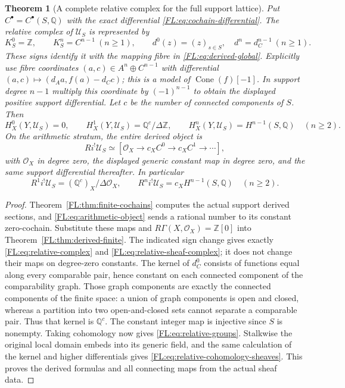 \documentclass[11pt,a4paper]{article}
\newtheorem{theorem}{Theorem}[section]
\theoremstyle{definition}\newtheorem{definition}[theorem]{Definition}
\providecommand{\RQ}{\mathbb Q}
\begin{document}
\begin{theorem}[A complete relative complex for the full support lattice]
\label{FL:thm:whole-relative-complex}
Put $C^\bullet=C^\bullet(S,\RQ)$ with the exact differential
\eqref{FL:eq:cochain-differential}. The relative complex of
$\mathcal U_S$ is represented by
\[
 K_S^0=\mathbb Z,\qquad K_S^n=C^{n-1}\ (n\ge1),\qquad
 d^0(z)=(z)_{s\in S},\quad d^n=d_C^{n-1}\ (n\ge1).
 \tag{FL19}\label{FL:eq:relative-complex}
\]
These signs identify it with the mapping fibre in
\eqref{FL:eq:derived-global}. Explicitly use fibre coordinates
$(a,c)\in A^n\oplus C^{n-1}$ with differential
$(a,c)\mapsto(d_Aa,f(a)-d_Cc)$; this is a model of
$\operatorname{Cone}(f)[-1]$. In support degree $n-1$ multiply this
coordinate by $(-1)^{n-1}$ to obtain the displayed positive
support differential. Let $c$ be the number
of connected components of $S$. Then
\[
 H_X^0(Y,\mathcal U_S)=0,\qquad
 H_X^1(Y,\mathcal U_S)=\RQ^c/\Delta\mathbb Z,
 \qquad
 H_X^n(Y,\mathcal U_S)=H^{n-1}(S,\RQ)\quad(n\ge2).
 \tag{FL20}\label{FL:eq:relative-groups}
\]
On the arithmetic stratum, the entire derived object is
\[
 Ri^!\mathcal U_S\simeq
 [\mathcal O_X\longrightarrow c_XC^0\longrightarrow
 c_XC^1\longrightarrow\cdots],
 \tag{FL21}\label{FL:eq:relative-sheaf-complex}
\]
with $\mathcal O_X$ in degree zero, the displayed generic constant
map in degree zero, and the same support differential thereafter.
In particular
\[
 R^1i^!\mathcal U_S=(\RQ^c)_X/\Delta\mathcal O_X,
 \qquad R^ni^!\mathcal U_S=c_XH^{n-1}(S,\RQ)\quad(n\ge2).
 \tag{FL22}\label{FL:eq:relative-cohomology-sheaves}
\]
\end{theorem}
\begin{proof}
Theorem~\ref{FL:thm:finite-cochains} computes the actual support derived
sections, and \eqref{FL:eq:arithmetic-object} sends a rational number
to its constant zero-cochain. Substitute these maps and
$R\Gamma(X,\mathcal O_X)=\mathbb Z[0]$ into
Theorem~\ref{FL:thm:derived-finite}. The indicated sign change gives
exactly \eqref{FL:eq:relative-complex} and
\eqref{FL:eq:relative-sheaf-complex}; it does not change their maps on
degree-zero constants.
The kernel of $d_C^0$ consists of functions equal along every
comparable pair, hence constant on each connected component of the
comparability graph. Those graph components are exactly the connected
components of the finite space: a union of graph components is open
and closed, whereas a partition into two open-and-closed sets cannot
separate a comparable pair. Thus that kernel is $\RQ^c$.
The constant integer map is injective since $S$ is nonempty. Taking
cohomology now gives \eqref{FL:eq:relative-groups}. Stalkwise the original
local domain embeds into its generic field, and the same calculation
of the kernel and higher differentials gives
\eqref{FL:eq:relative-cohomology-sheaves}. This proves the derived
formulas and all connecting maps from the actual sheaf data.
\end{proof}
\end{document}

